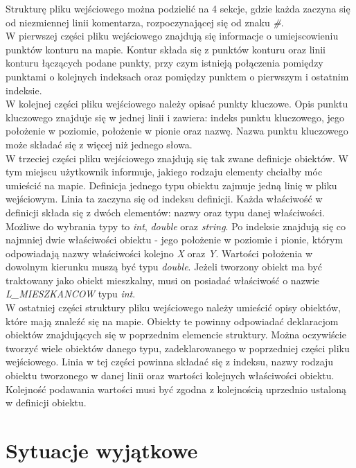 \documentclass[a4paper,12pt]{article}
\newcommand\tab[1][0.6cm]{\hspace*{#1} }
\begin{document}
Strukturę pliku wejściowego można podzielić na 4 sekcje, gdzie każda zaczyna się od niezmiennej linii komentarza, rozpoczynającej się od znaku \textit{\#}.
\\\tab W pierwszej części pliku wejściowego znajdują się informacje o umiejscowieniu punktów konturu na mapie. Kontur składa się z punktów konturu oraz linii konturu łączących podane punkty, przy czym istnieją połączenia pomiędzy punktami o kolejnych indeksach oraz pomiędzy punktem o pierwszym i ostatnim indeksie.
\\\tab W kolejnej części pliku wejściowego należy opisać punkty kluczowe. Opis punktu kluczowego znajduje się w jednej linii i zawiera: indeks punktu kluczowego, jego położenie w poziomie, położenie w pionie oraz nazwę. Nazwa punktu kluczowego może składać się z więcej niż jednego słowa.
\\\tab W trzeciej części pliku wejściowego znajdują się tak zwane definicje obiektów. W tym miejscu użytkownik informuje, jakiego rodzaju elementy chciałby móc umieścić na mapie. Definicja jednego typu obiektu zajmuje jedną linię w pliku wejściowym. Linia ta zaczyna się od indeksu definicji. Każda właściwość w definicji składa się z dwóch elementów: nazwy oraz typu danej właściwości. Możliwe do wybrania typy to \textit{int}, \textit{double} oraz \textit{string}. Po indeksie znajdują się co najmniej dwie właściwości obiektu - jego położenie w poziomie i pionie, którym odpowiadają nazwy właściwości kolejno \textit{X} oraz \textit{Y}. Wartości położenia w dowolnym kierunku muszą być typu \textit{double}. Jeżeli tworzony obiekt ma być traktowany jako obiekt mieszkalny, musi on posiadać właściwość o nazwie \textit{L\_MIESZKANCOW} typu \textit{int}.
\\\tab W ostatniej części struktury pliku wejściowego należy umieścić opisy obiektów, które mają znaleźć się na mapie. Obiekty te powinny odpowiadać deklaracjom obiektów znajdujących się w poprzednim elemencie struktury. Można oczywiście tworzyć wiele obiektów danego typu, zadeklarowanego w poprzedniej części pliku wejściowego. Linia w tej części powinna składać się z indeksu, nazwy rodzaju obiektu tworzonego w danej linii oraz wartości kolejnych właściwości obiektu. Kolejność podawania wartości musi być zgodna z kolejnością uprzednio ustaloną w definicji obiektu. 

\section{Sytuacje wyjątkowe}
\end{document}
